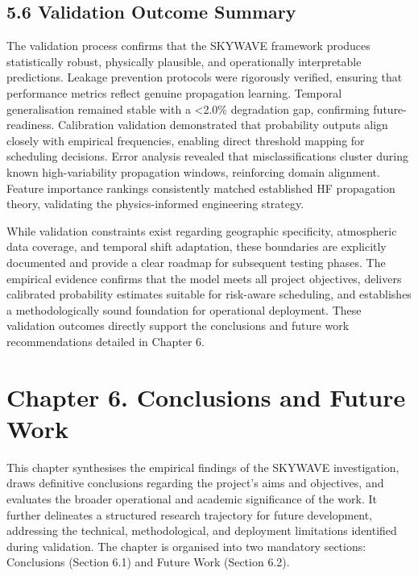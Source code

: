 \subsection{5.6 Validation Outcome
Summary}\label{validation-outcome-summary}

The validation process confirms that the SKYWAVE framework produces
statistically robust, physically plausible, and operationally
interpretable predictions. Leakage prevention protocols were rigorously
verified, ensuring that performance metrics reflect genuine propagation
learning. Temporal generalisation remained stable with a \textless2.0\%
degradation gap, confirming future-readiness. Calibration validation
demonstrated that probability outputs align closely with empirical
frequencies, enabling direct threshold mapping for scheduling decisions.
Error analysis revealed that misclassifications cluster during known
high-variability propagation windows, reinforcing domain alignment.
Feature importance rankings consistently matched established HF
propagation theory, validating the physics-informed engineering
strategy.

While validation constraints exist regarding geographic specificity,
atmospheric data coverage, and temporal shift adaptation, these
boundaries are explicitly documented and provide a clear roadmap for
subsequent testing phases. The empirical evidence confirms that the
model meets all project objectives, delivers calibrated probability
estimates suitable for risk-aware scheduling, and establishes a
methodologically sound foundation for operational deployment. These
validation outcomes directly support the conclusions and future work
recommendations detailed in Chapter 6.

\section{Chapter 6. Conclusions and Future
Work}\label{chapter-6.-conclusions-and-future-work}

This chapter synthesises the empirical findings of the SKYWAVE
investigation, draws definitive conclusions regarding the project's aims
and objectives, and evaluates the broader operational and academic
significance of the work. It further delineates a structured research
trajectory for future development, addressing the technical,
methodological, and deployment limitations identified during validation.
The chapter is organised into two mandatory sections: Conclusions
(Section 6.1) and Future Work (Section 6.2).

